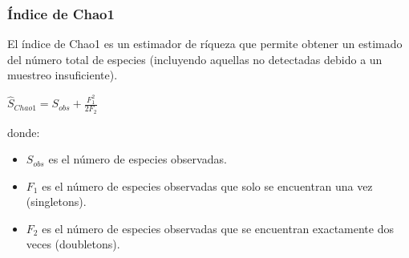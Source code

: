 \subsubsection{Índice de Chao1}
El índice de Chao1 es un estimador de ríqueza que permite obtener un estimado del número total de especies (incluyendo aquellas no detectadas debido a un muestreo insuficiente).
\begin{center}
    \begin{math}
\hat{S}_{Chao1} = S_{obs} + \frac{F_1^2}{2F_2}
\end{math}
\end{center}
donde:
\begin{itemize}
    \item $S_{obs}$ es el número de especies observadas.
    \item $F_1$ es el número de especies observadas que solo se encuentran una vez (singletons).
    \item $F_2$ es el número de especies observadas que se encuentran exactamente dos veces (doubletons).
\end{itemize}